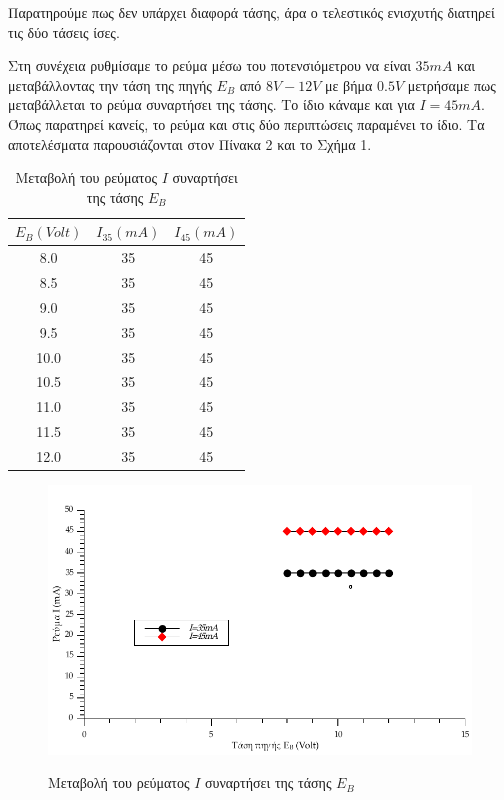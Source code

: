 \documentclass[a4paper,12pt,titlepage]{article}
\makeatletter
\def\maxwidth{
\ifdim\Gin@nat@width>\linewidth
\linewidth
\else
\Gin@nat@width
\fi
}
\makeatother
\begin{document}
Παρατηρούμε πως δεν υπάρχει διαφορά τάσης, άρα ο τελεστικός ενισχυτής διατηρεί τις δύο τάσεις ίσες.

\newpage

Στη συνέχεια ρυθμίσαμε το ρεύμα μέσω του ποτενσιόμετρου να είναι $35mA$ και μεταβάλλοντας την τάση της πηγής $E_{B}$ από $8V-12V$ με βήμα $0.5V$ μετρήσαμε πως μεταβάλλεται το ρεύμα συναρτήσει της τάσης. Το ίδιο κάναμε και για $I=45mA$. Όπως παρατηρεί κανείς, το ρεύμα και στις δύο περιπτώσεις παραμένει το ίδιο. Τα αποτελέσματα παρουσιάζονται στον Πίνακα 2 και το Σχήμα 1.

\begin{table}[h!]
\begin{center}
    \begin{tabular}{ | c | c | c |}
    \hline
     $E_{B}(Volt)$ & $I_{35} (mA)$ & $I_{45} (mA)$\\ \hline
     8.0  & 35	& 45 \\ \hline
     8.5  & 35	& 45 \\ \hline
     9.0  & 35	& 45 \\ \hline
     9.5  & 35	& 45 \\ \hline
     10.0 & 35	& 45 \\ \hline
     10.5 & 35	& 45 \\ \hline
     11.0 & 35	& 45 \\ \hline
     11.5 & 35	& 45 \\ \hline
     12.0 & 35	& 45 \\ \hline
    \end{tabular}
\end{center}
\caption{Μεταβολή του ρεύματος $I$ συναρτήσει της τάσης $E_{B}$}
\end{table}

\begin{figure}[!h]
\centering
\includegraphics[width=\maxwidth]{graph1.pdf}\\[0.3cm]
\caption{Μεταβολή του ρεύματος $I$ συναρτήσει της τάσης $E_{B}$}
\end{figure}
\end{document}
